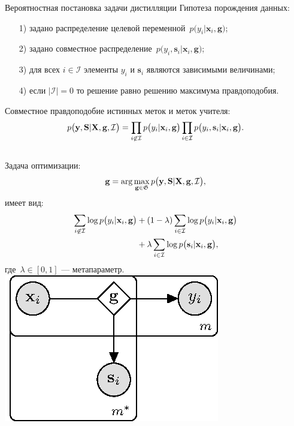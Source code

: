 \documentclass[10pt,pdf,hyperref={unicode}]{beamer}
\begin{document}
\begin{frame}{Вероятностная постановка задачи дистилляции}
\justifying
Гипотеза порождения данных:
\begin{enumerate}
	\item[1)] задано распределение целевой переменной~$p\bigr(y_i|\mathbf{x}_i, \mathbf{g}\bigr)$;
	\item[2)] задано совместное распределение~$p\bigr(y_i, \mathbf{s}_i|\mathbf{x}_i, \mathbf{g}\bigr)$;
	\item[3)] для всех $i \in \mathcal{I}$ элементы $y_i$ и $\mathbf{s}_i$ являются зависимыми величинами;
	\item[4)] если $|\mathcal{I}|=0$ то решение равно решению максимума правдоподобия.
\end{enumerate}
Совместное правдоподобие истинных меток и меток учителя:
\[
\setlength\abovedisplayskip{0pt}
p\bigr(\mathbf{y}, \mathbf{S}|\mathbf{X}, \mathbf{g}, \mathcal{I}\bigr)=\prod_{i\not\in \mathcal{I}}p\bigr(y_i|\mathbf{x}_i, \mathbf{g}\bigr)\prod_{i\in \mathcal{I}}p\bigr(y_i, \mathbf{s}_i|\mathbf{x}_i, \mathbf{g}\bigr).
\setlength\belowdisplayskip{0pt}
\]

\begin{columns}
Задача оптимизации:
\[
\setlength\abovedisplayskip{0pt}
\mathbf{g} = \arg\max_{\mathbf{g} \in \mathfrak{G}} p\bigr(\mathbf{y}, \mathbf{S}|\mathbf{X}, \mathbf{g}, \mathcal{I}\bigr),
\setlength\belowdisplayskip{0pt}
\]
имеет вид:
\[
\setlength\abovedisplayskip{0pt}
\begin{aligned}
\sum_{i\not\in \mathcal{I}}\log p\bigr(y_i|\mathbf{x}_i, \mathbf{g}\bigr) &+ \left(1-\lambda\right)\sum_{i\in \mathcal{I}}\log p\bigr(y_i|\mathbf{x}_i, \mathbf{g}\bigr) \\
&+ \lambda\sum_{i\in \mathcal{I}}\log p\bigr(\mathbf{s}_i|\mathbf{x}_i, \mathbf{g}\bigr),
\end{aligned}
\setlength\belowdisplayskip{0pt}
\]
где~$\lambda \in [0,1]$ --- метапараметр.
\includegraphics[width=\textwidth]{figures/proba_model}
\end{columns}

\end{frame}
\end{document}
